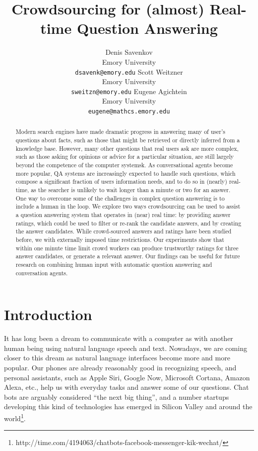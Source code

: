 \documentclass[11pt,letterpaper]{article}
\title{Crowdsourcing for (almost) Real-time Question Answering}
\author{Denis Savenkov \\ Emory University \\ {\tt dsavenk@emory.edu} 
  \And Scott Weitzner \\ Emory University \\ {\tt sweitzn@emory.edu}
  \And Eugene Agichtein \\ Emory University \\ {\tt eugene@mathcs.emory.edu}
}
\date{}
\begin{document}
\maketitle

\begin{abstract}

Modern search engines have made dramatic progress in answering many of user's questions about facts, such as those that might be retrieved or directly inferred from a knowledge base. However, many other questions that real users ask are more complex, such as those asking for opinions or advice for a particular situation, are still largely beyond the competence of the computer systemsk.
As conversational agents become more popular, QA systems are increasingly expected to handle such questions, which compose a significant fraction of users information needs, and to do so in (nearly) real-time, as the searcher is unlikely to wait longer than a minute or two for an answer.
One way to overcome some of the challenges in complex question answering is to include a human in the loop.
We explore two ways crowdsourcing can be used to assist a question answering system that operates in (near) real time: by providing answer ratings, which could be used to filter or re-rank the candidate answers, and by creating the answer candidates. While crowd-sourced answers and ratings have been studied before, we  with externally imposed time restrictions. 
Our experiments show that within one minute time limit crowd workers can produce trustworthy ratings for three answer candidates, or generate a relevant answer.
Our findings can be useful for future research on combining human input with automatic question answering and conversation agents.

\end{abstract}

\section{Introduction}
\label{sec:introduction}

It has long been a dream to communicate with a computer as with another human being using natural language speech and text.
Nowadays, we are coming closer to this dream as natural language interfaces become more and more popular.
Our phones are already reasonably good in recognizing speech, and personal assistants, such as Apple Siri, Google Now, Microsoft Cortana, Amazon Alexa, etc., help us with everyday tasks and answer some of our questions.
Chat bots are arguably considered ``the next big thing'', and a number startups developing this kind of technologies has emerged in Silicon Valley and around the world\footnote{http://time.com/4194063/chatbots-facebook-messenger-kik-wechat/}.
\end{document}
